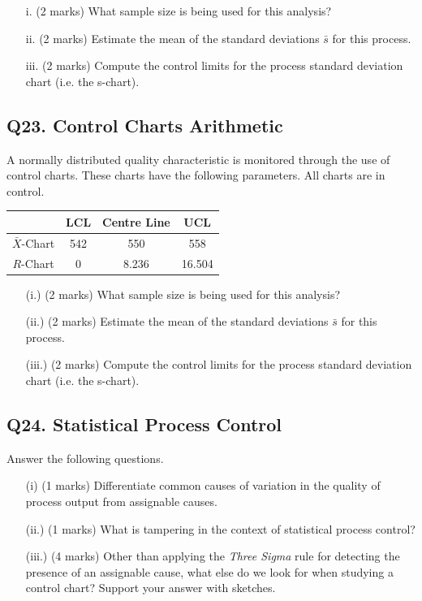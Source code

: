\documentclass[a4paper,12pt]{article}
\begin{document}
\begin{itemize}
	\item[i.] (2 marks) What sample size is being used for this analysis?
	\item[ii.] (2 marks) Estimate the mean of the standard deviations $\bar{s}$ for this process.
	\item[iii.] (2 marks) Compute the control limits for the process standard deviation chart (i.e. the s-chart).
\end{itemize}

\subsection*{Q23. Control Charts Arithmetic}

A normally distributed quality characteristic is monitored through the use of control charts. These charts have the following parameters. All charts are in control.
\begin{center}
	\begin{tabular}{|c|c|c|c|}
		\hline  & LCL & Centre Line & UCL \\
		\hline $\bar{X}$-Chart & 542 & 550 & 558 \\
		\hline $R$-Chart & 0 & 8.236 & 16.504 \\ \hline
	\end{tabular}
\end{center}

\begin{itemize}
	\item[(i.)] (2 marks) What sample size is being used for this analysis?
	\item[(ii.)](2 marks) Estimate the mean of the standard deviations $\bar{s}$ for this process.
	\item[(iii.)] (2 marks) Compute the control limits for the process standard deviation chart (i.e. the s-chart).
\end{itemize}

\subsection*{Q24. Statistical Process Control}
Answer the following questions.

\begin{itemize}
	\item[(i)] (1 marks) Differentiate common causes of variation in the quality of process output from assignable causes.
	\item[(ii.)] (1 marks) What is tampering in the context of statistical process control?
	\item[(iii.)] (4 marks) Other than applying the \emph{Three Sigma} rule for detecting the presence of an assignable cause, what else do we look for when studying a control chart? Support your answer with sketches.
\end{itemize}
\end{document}
